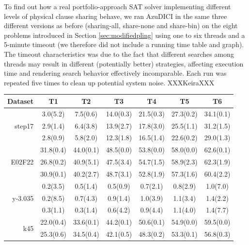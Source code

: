To find out how a real portfolio-approach SAT solver implementing
different levels of physical clause sharing behave, we ran AzuDICI in
the same three different versions as before (sharing-all, share-none
and share-bin) on the eight problems introduced in Section
\ref{sec:modifiedpling} using one to six threads and a 5-minute
timeout (we therefore did not include a running time table and
graph). The timeout characteristics was due to the fact that different
searches among threads may result in different (potentially better)
strategies, affecting execution time and rendering search behavior
effectively incomparable. Each run was repeated five times to clean up
potential system noise. XXXKeiraXXX


  \bgroup
  \def\arraystretch{1.5}

	\begin{table}[htbp]
	 \footnotesize
    \centering
		\begin{tabular}[h]{rcccccc} \hline
      Dataset  &  T1   & T2    & T3    &  T4   &  T5   &  T6 \\ \hline
	  \multirow{3}{*}{step17}		 &  3.0(5.2)		 &  7.5(0.6)		 &  14.0(0.3)		 &  21.5(0.3)		 &  27.3(0.2)		 &  34.1(0.1)		 \\
      &  2.9(1.4)		 &  6.4(3.8)		 &  13.9(2.7)		 &  17.8(3.0)		 &  25.5(1.1)		 &  31.2(1.5)		 \\
      &  2.8(0.9)		 &  5.8(2.0)		 &  12.3(1.8)		 &  16.5(1.4)		 &  22.6(0.2)		 &  29.0(1.3)		 \\ \hline
	  \multirow{3}{*}{E02F22}		 &  31.8(0.4)		 &  44.0(0.1)		 &  48.5(0.0)		 &  53.8(0.0)		 &  58.0(0.0)		 &  62.6(0.1)		 \\
      &  26.8(0.2)		 &  40.9(5.1)		 &  47.5(3.4)		 &  54.7(1.5)		 &  58.9(2.3)		 &  62.3(1.9)		 \\
      &  30.9(0.1)		 &  40.2(2.7)		 &  48.7(3.1)		 &  52.8(1.9)		 &  57.3(1.6)		 &  60.4(2.2)		 \\ \hline
	  \multirow{3}{*}{y-3.035}		 &  0.2(3.5)		 &  0.5(1.4)		 &  0.5(0.9)		 &  0.7(2.1)		 &  0.8(2.9)		 &  1.0(7.0)		 \\
      &  0.2(8.5)		 &  0.7(4.3)		 &  0.9(1.4)		 &  1.0(3.9)		 &  1.1(3.4)		 &  1.4(2.2)		 \\
      &  0.3(1.1)		 &  0.3(1.4)		 &  0.6(4.2)		 &  0.9(4.4)		 &  1.1(4.0)		 &  1.4(7.7)		 \\ \hline
	  \multirow{3}{*}{k45}			 &  22.0(0.4)		 &  33.6(0.1)		 &  44.2(0.1)		 &  50.6(0.1)		 &  54.9(0.0)		 &  59.5(0.0)		 \\
      &  25.3(0.6)		 &  34.5(0.4)		 &  42.1(0.5)		 &  48.3(0.2)		 &  53.3(0.1)		 &  56.8(0.3)		 \\

\end{tabular}
\end{table}
